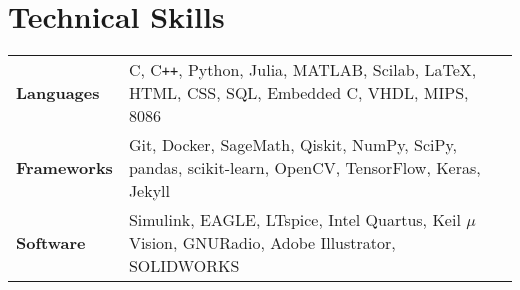 \documentclass[10pt, a4paper]{article}
\begin{document}
\section{Technical Skills}
\setlength\tabcolsep{0.3em}
\vspace{-0.3em}
\hspace{-5pt}
\begin{tabular}{p{1.15in}p{5.85in}}
\textbf{Languages}& C, C\texttt{++}, Python, Julia, MATLAB, Scilab, \LaTeX, HTML, CSS,  SQL, Embedded C, VHDL, MIPS, 8086\\%
\textbf{Frameworks}& Git, Docker, SageMath, Qiskit, NumPy, SciPy, pandas, scikit-learn, OpenCV, TensorFlow, Keras, Jekyll\\%
\textbf{Software}& Simulink, EAGLE, LTspice, Intel Quartus, Keil $\mu$Vision, GNURadio, Adobe Illustrator, SOLIDWORKS\\%
\end{tabular}
\end{document}
